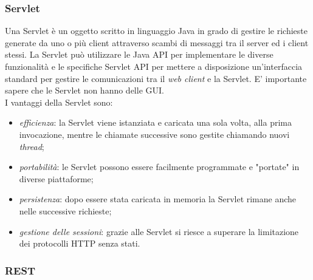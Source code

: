 \subsubsection{Servlet}
\label{subsubsec:servlet}

Una Servlet è un oggetto scritto in linguaggio Java in grado di gestire le richieste generate da uno o più client attraverso scambi di messaggi tra il server ed i client stessi. La Servlet può utilizzare le Java API per implementare le diverse funzionalità e le specifiche Servlet API per mettere a disposizione un'interfaccia standard per gestire le comunicazioni tra il \textit{web client} e la Servlet. E' importante sapere che le Servlet non hanno delle GUI.\\
I vantaggi della Servlet sono:
\begin{itemize}
	\item \textit{efficienza}: la Servlet viene istanziata e caricata una sola volta, alla prima invocazione, mentre le chiamate successive sono gestite chiamando nuovi \textit{thread};
	\item \textit{portabilità}: le Servlet possono essere facilmente programmate e "portate" in diverse piattaforme;
	\item \textit{persistenza}: dopo essere stata caricata in memoria la Servlet rimane anche nelle successive richieste;
	\item \textit{gestione delle sessioni}: grazie alle Servlet si riesce a superare la limitazione dei protocolli HTTP senza stati.
\end{itemize}

\subsubsection{REST}
\label{subsubsec:rest}

